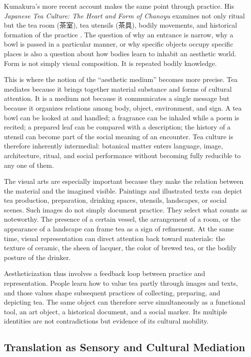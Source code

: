 \documentclass[numbers]{IntechOpen-Book}
\newcommand{\zh}[1]{{\CJKfontspec{Noto Serif CJK SC}\upshape #1}}
\begin{document}
Kumakura's more recent account makes the same point through practice. His \textit{Japanese Tea Culture: The Heart and Form of Chanoyu} examines not only ritual but the tea room (\zh{茶室}), tea utensils (\zh{茶具}), bodily movements, and historical formation of the practice \cite{kumakura}. The question of why an entrance is narrow, why a bowl is passed in a particular manner, or why specific objects occupy specific places is also a question about how bodies learn to inhabit an aesthetic world. Form is not simply visual composition. It is repeated bodily knowledge.

This is where the notion of the ``aesthetic medium'' becomes more precise. Tea mediates because it brings together material substance and forms of cultural attention. It is a medium not because it communicates a single message but because it organizes relations among body, object, environment, and sign. A tea bowl can be looked at and handled; a fragrance can be inhaled while a poem is recited; a prepared leaf can be compared with a description; the history of a utensil can become part of the social meaning of an encounter. Tea culture is therefore inherently intermedial: botanical matter enters language, image, architecture, ritual, and social performance without becoming fully reducible to any one of them.

The visual arts are especially important because they make the relation between the material and the imagined visible. Paintings and illustrated texts can depict tea production, preparation, drinking spaces, utensils, landscapes, or social scenes. Such images do not simply document practice. They select what counts as noteworthy. The presence of a certain vessel, the arrangement of a room, or the appearance of a landscape can frame tea as a sign of refinement. At the same time, visual representation can direct attention back toward materials: the texture of ceramic, the sheen of lacquer, the color of brewed tea, or the bodily posture of the drinker.

Aestheticization thus involves a feedback loop between practice and representation. People learn how to value tea partly through images and texts, and those values shape subsequent practices of collecting, preparing, and depicting tea. The same object can therefore serve simultaneously as a functional tool, an art object, a historical document, and a social marker. Its multiple identities are not contradictions but evidence of its cultural mobility.

\subsection{Translation as Sensory and Cultural Mediation}
\end{document}
